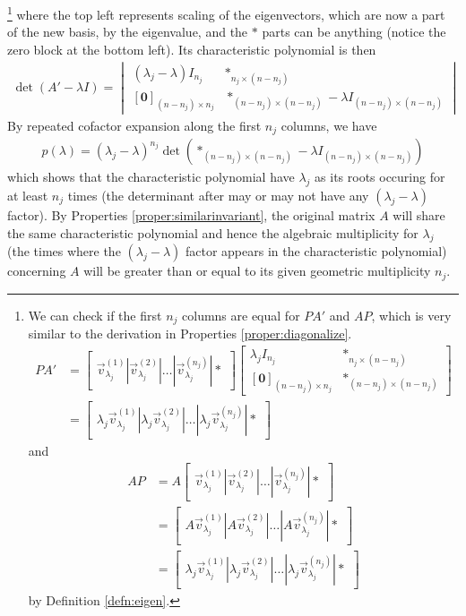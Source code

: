 \footnote{We can check if the first $n_j$ columns are equal for $PA'$ and $AP$, which is very similar to the derivation in Properties \ref{proper:diagonalize}.
\begin{align*}
PA' &= \begin{bmatrix}
\vec{v}_{\lambda_j}^{(1)}|\vec{v}_{\lambda_j}^{(2)}|\ldots|\vec{v}_{\lambda_j}^{(n_j)}|*
\end{bmatrix}
\begin{bmatrix}
\lambda_j I_{n_j} & *_{n_j\times(n-n_j)} \\
[\textbf{0}]_{(n-n_j)\times n_j} & *_{(n-n_j)\times(n-n_j)}
\end{bmatrix} \\
&=
\begin{bmatrix}
\lambda_j\vec{v}_{\lambda_j}^{(1)}|\lambda_j\vec{v}_{\lambda_j}^{(2)}|\ldots|\lambda_j\vec{v}_{\lambda_j}^{(n_j)}|*
\end{bmatrix}
\end{align*} and
\begin{align*}
AP &= A\begin{bmatrix}
\vec{v}_{\lambda_j}^{(1)}|\vec{v}_{\lambda_j}^{(2)}|\ldots|\vec{v}_{\lambda_j}^{(n_j)}|*
\end{bmatrix} \\
&= 
\begin{bmatrix}
A\vec{v}_{\lambda_j}^{(1)}|A\vec{v}_{\lambda_j}^{(2)}|\ldots|A\vec{v}_{\lambda_j}^{(n_j)}|*
\end{bmatrix} \\
&= \begin{bmatrix}
\lambda_j\vec{v}_{\lambda_j}^{(1)}|\lambda_j\vec{v}_{\lambda_j}^{(2)}|\ldots|\lambda_j\vec{v}_{\lambda_j}^{(n_j)}|*
\end{bmatrix}
\end{align*}
by Definition \ref{defn:eigen}.} 
where the top left represents scaling of the eigenvectors, which are now a part of the new basis, by the eigenvalue, and the $*$ parts can be anything (notice the zero block at the bottom left). Its characteristic polynomial is then 
\begin{align*}
\det(A'-\lambda I) =
\begin{vmatrix}
(\lambda_j-\lambda) I_{n_j} & *_{n_j\times(n-n_j)} \\
[\textbf{0}]_{(n-n_j)\times n_j} & *_{(n-n_j)\times(n-n_j)}-\lambda I_{(n-n_j)\times(n-n_j)}    
\end{vmatrix}
\end{align*}
By repeated cofactor expansion along the first $n_j$ columns, we have
\begin{align*}
p(\lambda) = (\lambda_j-\lambda)^{n_j} \det(*_{(n-n_j)\times(n-n_j)}-\lambda I_{(n-n_j)\times(n-n_j)})
\end{align*}
which shows that the characteristic polynomial have $\lambda_j$ as its roots occuring for at least $n_j$ times (the determinant after may or may not have any $(\lambda_j-\lambda)$ factor). By Properties \ref{proper:similarinvariant}, the original matrix $A$ will share the same characteristic polynomial and hence the algebraic multiplicity for $\lambda_j$ (the times where the $(\lambda_j-\lambda)$ factor appears in the characteristic polynomial) concerning $A$ will be greater than or equal to its given geometric multiplicity $n_j$.

